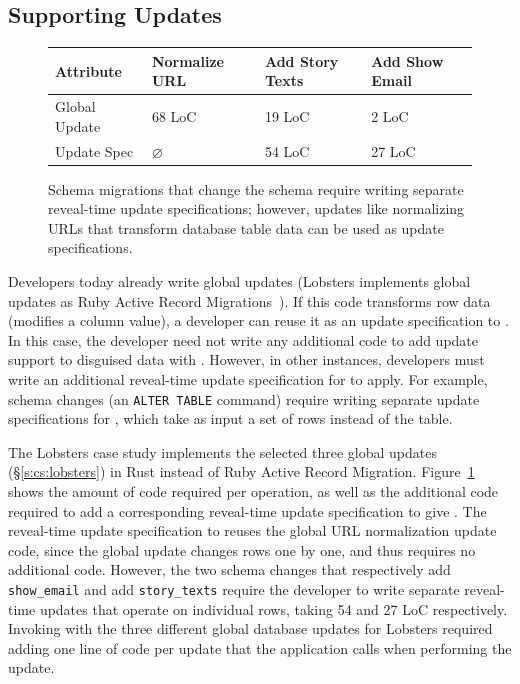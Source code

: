 \subsection{Supporting Updates}
\begin{figure}
    \centering
    \begin{tabular}{m{}|m{}|m{}|m{}}
        \centering\textbf{Attribute} & \textbf{Normalize URL} & \textbf{Add Story Texts} &
        \textbf{Add Show Email} \\
        \hline
        Global Update & 68 LoC & 19 LoC & 2 LoC \\
        \hline
        Update Spec & $\varnothing$ & 54 LoC & 27 LoC \\
    \end{tabular}
    \caption[Code required to write reveal-time update specifications.]{Schema
    migrations that change the schema require
    writing separate reveal-time update specifications; however, updates like
    normalizing URLs that transform database table data can be used as update
    specifications.}
    \label{tab:updates}
\end{figure}

Developers today already write global updates (\eg Lobsters implements global
updates as Ruby Active Record Migrations~\cite{ruby_arm}). If this code
transforms row data (\eg modifies a column value), a developer can reuse it as
an update specification to \sys. In this case, the developer need not write any
additional code to add update support to disguised data with \sys.
%
However, in other instances, developers must write an additional
reveal-time update specification for \sys to apply.
%
For example, schema changes (\eg an \texttt{ALTER TABLE} command) require
writing separate update specifications for \sys, which take as input a set of
rows instead of the table.
%

%
The Lobsters case study implements the selected three global updates
(\S\ref{s:cs:lobsters})
in Rust instead of Ruby Active Record Migration. Figure~\ref{tab:updates} shows
the amount of code required per operation, as well as the additional code
required to add a corresponding reveal-time update specification to give \sys.
The reveal-time update specification to \sys reuses the global URL normalization
update code, since the global update changes rows one by one, and thus requires
no additional code.
%
However, the two schema changes that respectively add
\texttt{show\_email} and add \texttt{story\_texts} require the developer to
write separate reveal-time updates that operate on individual rows, taking 54
and 27 LoC respectively.
%
%
Invoking \sys with the three different global database updates for Lobsters
required adding one line of code per update that the application calls when
performing the update. 
%

